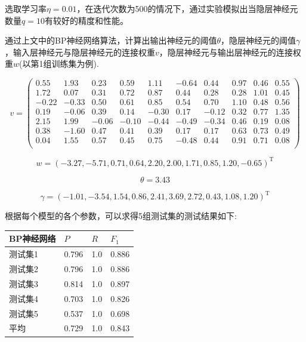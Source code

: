 \documentclass{ctexart}
\begin{document}
选取学习率$\eta=0.01$，在迭代次数为500的情况下，通过实验模拟出当隐层神经元数量$q=10$有较好的精度和性能。

通过上文中的BP神经网络算法，计算出输出神经元的阈值$\theta$，隐层神经元的阈值$\gamma$，输入层神经元与隐层神经元的连接权重$v$，隐层神经元与输出层神经元的连接权重$w$(以第1组训练集为例).
\begin{small}
$$
 v=\left(
 \begin{matrix}
   0.55 & 1.93 & 0.23&  0.59 & 1.11 & -0.64  & 0.44 & 0.97 & 0.46  &0.55 \\
   1.72 & 0.07 & 0.31  & 0.72 & 0.87 & 0.44 &  0.28 & 0.28 & 1.01 & 0.45 \\
   -0.22 &-0.33 & 0.50 & 0.61  &0.85 & 0.54  & 0.70 & 1.10 & 0.48&  0.56\\
    0.19& -0.06 & 0.39 & 0.14 &-0.30 & 0.17& -0.12 & 0.32 & 0.77&  1.35\\
    2.15 & 1.99 & -0.06& -0.10& -0.44& -0.49  &-0.34 &  0.46&  0.19 & 0.08\\
    0.38& -1.60 & 0.47 & 0.41 & 0.39 & 0.17 &  0.17 & 0.63 &  0.73 & 0.49\\
    0.04 & 1.55 & 0.57 & 0.45&  0.75 &-0.48 &  0.44 & 0.91  & 0.71 & 0.08\\
  \end{matrix}
  \right)
$$

$$w=(-3.27,-5.71,0.71,0.64,2.20,2.00,1.71,0.85,1.20,-0.65)^{\mathrm{T}}$$

$$\theta=3.43$$

$$\gamma=(-1.01,-3.54,1.54,0.86,2.41,3.69,2.72,0.43,1.08,1.20)^{\mathrm{T}}$$

\end{small}

根据每个模型的各个参数，可以求得5组测试集的测试结果如下:

\begin{table}[!h]\center\small
\begin{tabular}{|l|l|l|l|}
\hline
BP神经网络&$P$&$R$&$F_{1}$\\
\hline
测试集1& 0.796& 1.0&  0.886\\\hline
测试集2& 0.796 &1.0&  0.886\\\hline
测试集3& 0.814 &1.0&  0.897\\\hline
测试集4 &0.703 &1.0&  0.826\\\hline
测试集5& 0.537 &1.0 & 0.698\\\hline
平均  &  0.729& 1.0 & 0.843\\\hline
\end{tabular}
\end{table}
\end{document}
